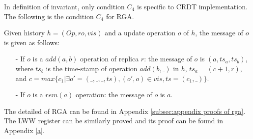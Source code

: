 In definition of invariant, only condition $C_4$ is specific to CRDT implementation. The following is the condition $C_4$ for RGA.

\begin{example}
\label{example:c4 for rga}
Given history $h = (\mathit{Op},\mathit{ro},\mathit{vis})$ and a update operation $o$ of $h$, the message of $o$ is given as follows:

\begin{itemize}
\setlength{\itemsep}{0.5pt}
\item[-] If $o$ is a $\mathit{add}(a,b)$ operation of replica $r$: the message of $o$ is $(a,\mathit{ts}_a,\mathit{ts}_b)$, where $\mathit{ts}_b$ is the time-stamp of operation $\mathit{add}(b,\_)$ in $h$, $\mathit{ts}_a = (c+1, r)$, and $c = \mathit{max}\{ c_1 \vert \exists o' = (\_,\_,\_,\mathit{ts}), (o',o) \in \mathit{vis}, \mathit{ts} = (c_1,\_) \}$.

\item[-] If $o$ is a $\mathit{rem}(a)$ operation: the message of $o$ is $a$.
\end{itemize}
\end{example}

The detailed of RGA can be found in Appendix \ref{subsec:appendix proofs of rga}. The LWW register can be similarly proved and its proof can be found in Appendix \ref{a}.











